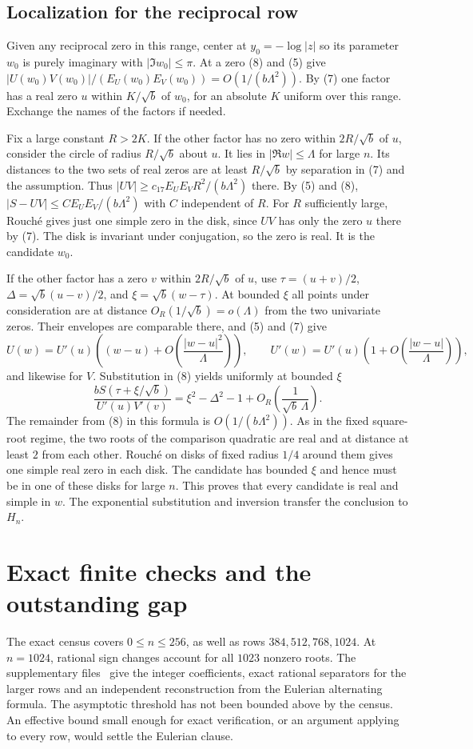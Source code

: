 \documentclass[11pt]{article}
\begin{document}
\subsection{Localization for the reciprocal row}

Given any reciprocal zero in this range, center at $y_0=-\log|z|$ so its parameter $w_0$ is purely imaginary with $|\Im w_0|\le\pi$. At a zero (8) and (5) give $|U(w_0)V(w_0)|/(E_U(w_0)E_V(w_0))=O(1/(b\Lambda^2))$. By (7) one factor has a real zero $u$ within $K/\sqrt b$ of $w_0$, for an absolute $K$ uniform over this range. Exchange the names of the factors if needed.

Fix a large constant $R>2K$. If the other factor has no zero within $2R/\sqrt b$ of $u$, consider the circle of radius $R/\sqrt b$ about $u$. It lies in $|\Re w|\le\Lambda$ for large $n$. Its distances to the two sets of real zeros are at least $R/\sqrt b$ by separation in (7) and the assumption. Thus $|UV|\ge c_{17} E_UE_V R^2/(b\Lambda^2)$ there. By (5) and (8), $|S-UV|\le C E_UE_V/(b\Lambda^2)$ with $C$ independent of $R$. For $R$ sufficiently large, Rouché gives just one simple zero in the disk, since $UV$ has only the zero $u$ there by (7). The disk is invariant under conjugation, so the zero is real. It is the candidate $w_0$.

If the other factor has a zero $v$ within $2R/\sqrt b$ of $u$, use $\tau=(u+v)/2$, $\Delta=\sqrt b(u-v)/2$, and $\xi=\sqrt b(w-\tau)$. At bounded $\xi$ all points under consideration are at distance $O_R(1/\sqrt b)=o(\Lambda)$ from the two univariate zeros. Their envelopes are comparable there, and (5) and (7) give
\[
 U(w)=U'(u)\left((w-u)+O\!\left(\frac{|w-u|^2}{\Lambda}\right)\right),
 \qquad
 U'(w)=U'(u)\left(1+O\!\left(\frac{|w-u|}{\Lambda}\right)\right),
\]
and likewise for $V$. Substitution in (8) yields uniformly at bounded $\xi$
\[
 \frac{b S(\tau+\xi/\sqrt b)}{U'(u)V'(v)}
 =\xi^2-\Delta^2-1
   +O_R\!\left(\frac1{\sqrt b\,\Lambda}\right).
\]
The remainder from (8) in this formula is $O(1/(b\Lambda^2))$. As in the fixed square-root regime, the two roots of the comparison quadratic are real and at distance at least $2$ from each other. Rouché on disks of fixed radius $1/4$ around them gives one simple real zero in each disk. The candidate has bounded $\xi$ and hence must be in one of these disks for large $n$. This proves that every candidate is real and simple in $w$. The exponential substitution and inversion transfer the conclusion to $H_n$.
\section{Exact finite checks and the outstanding gap}
The exact census covers $0\le n\le256$, as well as rows $384,512,768,1024$. At $n=1024$, rational sign changes account for all $1023$ nonzero roots. The supplementary files~\cite{project} give the integer coefficients, exact rational separators for the larger rows and an independent reconstruction from the Eulerian alternating formula. The asymptotic threshold has not been bounded above by the census. An effective bound small enough for exact verification, or an argument applying to every row, would settle the Eulerian clause.
\end{document}
